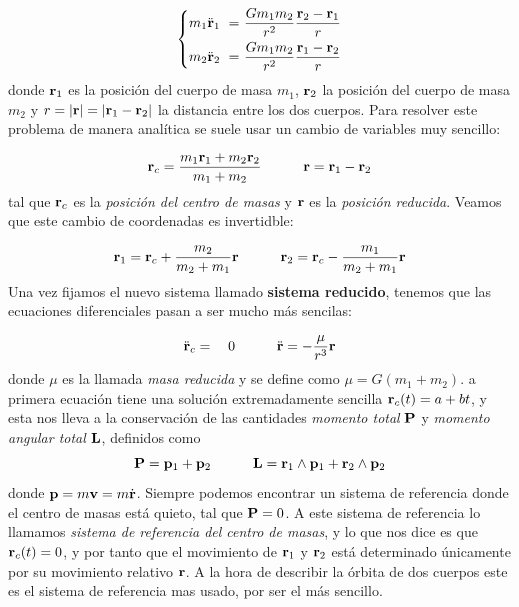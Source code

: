\begin{equation}
    \left\lbrace  
    \begin{split}
        m_1 \ddot{\mathbf{r}}_1 \ = \ & \frac{Gm_1m_2}{r^2} \frac{\mathbf{r}_2-\mathbf{r}_1}{r} \\
        m_2 \ddot{\mathbf{r}}_2 \ = \ & \frac{Gm_1m_2}{r^2} \frac{\mathbf{r}_1-\mathbf{r}_2}{r} 
    \end{split} \right.
\end{equation}
donde $\mathbf{r}_1$ es la posición del cuerpo de masa $m_1$, $\mathbf{r}_2$ la posición del cuerpo de masa $m_2$ y $r=|\mathbf{r}|=|\mathbf{r}_1-\mathbf{r}_2|$ la distancia entre los dos cuerpos. Para resolver este problema de manera analítica se suele usar un cambio de variables muy sencillo:

\begin{equation}
    \mathbf{r}_c = \frac{m_1\mathbf{r}_1+m_2\mathbf{r}_2}{m_1+m_2} \quad \quad \quad \mathbf{r}=\mathbf{r}_1-\mathbf{r}_2
\end{equation}
tal que $\mathbf{r}_c$ es la \textit{posición del centro de masas} y $\mathbf{r}$ es la \textit{posición reducida}. Veamos que este cambio de coordenadas es invertidble:

\begin{equation}
    \mathbf{r}_1 = \mathbf{r}_c + \frac{m_2}{m_2+m_1} \mathbf{r}  \quad \quad \quad \mathbf{r}_2 = \mathbf{r}_c - \frac{m_1}{m_2+m_1} \mathbf{r} 
\end{equation}
Una vez fijamos el nuevo sistema llamado \textbf{sistema reducido}, tenemos que las ecuaciones diferenciales pasan a ser mucho más sencilas:

\begin{equation}
        \ddot{\mathbf{r}}_c  =  \quad 0 \quad \quad \quad
        \ddot{\mathbf{r}}  = - \frac{\mu}{r^3} \mathbf{r}
\end{equation}
donde $\mu$ es la llamada \textit{masa reducida} y se define como $\mu = G (m_1+m_2)$. a primera ecuación tiene una solución extremadamente sencilla $\mathbf{r}_c(t)=a+bt$, y esta nos lleva a la conservación de las cantidades \textit{momento total} $\mathbf{P}$ y \textit{momento angular total} $\mathbf{L}$, definidos como
\begin{equation}
    \mathbf{P} = \mathbf{p}_1 + \mathbf{p}_2 \quad \quad \quad \mathbf{L} = \mathbf{r}_1 \wedge \mathbf{p}_1 + \mathbf{r}_2 \wedge \mathbf{p}_2
\end{equation}
donde $\mathbf{p}=m\mathbf{v}=m\dot{\mathbf{r}}$. Siempre podemos encontrar un sistema de referencia donde el centro de masas está quieto, tal que $\mathbf{P}=0$. A este sistema de referencia lo llamamos \textit{sistema de referencia del centro de masas}, y lo que nos dice es que $\mathbf{r}_c(t)=0$, y por tanto que el movimiento de $\mathbf{r}_1$ y $\mathbf{r}_2$ está determinado únicamente por su movimiento relativo $\mathbf{r}$. A la hora de describir la órbita de dos cuerpos este es el sistema de referencia mas usado, por ser el más sencillo.

